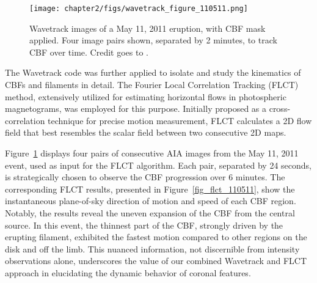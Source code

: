 \begin{figure}[!htp]
	\centering
	\texttt{[image: chapter2/figs/wavetrack\_figure\_110511.png]}
	\caption{Wavetrack images of a May 11, 2011 eruption, with CBF mask applied. Four image pairs shown, separated by 2 minutes, to track CBF over time. Credit goes to \citet{stepanyuk_2022}.}
	\label{fig_wavetrack_cbf_center}
\end{figure}

The Wavetrack code was further applied to isolate and study the kinematics of CBFs and filaments in detail. The Fourier Local Correlation Tracking (FLCT) method, extensively utilized for estimating horizontal flows in photospheric magnetograms, was employed for this purpose. Initially proposed as a cross-correlation technique for precise motion measurement, FLCT calculates a 2D flow field that best resembles the scalar field between two consecutive 2D maps.

Figure~\ref{fig_wavetrack_cbf_center} displays four pairs of consecutive AIA images from the May 11, 2011 event, used as input for the FLCT algorithm. Each pair, separated by 24 seconds, is strategically chosen to observe the CBF progression over 6 minutes. The corresponding FLCT results, presented in Figure~\ref{fig_flct_110511}, show the instantaneous plane-of-sky direction of motion and speed of each CBF region. Notably, the results reveal the uneven expansion of the CBF from the central source. In this event, the thinnest part of the CBF, strongly driven by the erupting filament, exhibited the fastest motion compared to other regions on the disk and off the limb. This nuanced information, not discernible from intensity observations alone, underscores the value of our combined Wavetrack and FLCT approach in elucidating the dynamic behavior of coronal features.

